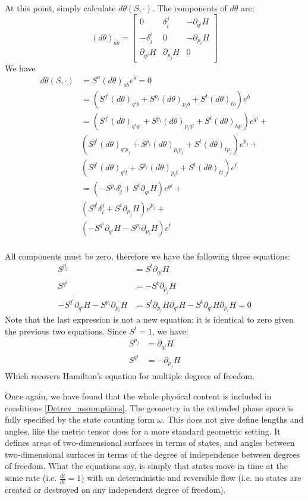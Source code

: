 \documentclass[10pt,twocolumn, nofootinbib]{revtex4-2}
\begin{document}
At this point, simply calculate $d\theta(S, \cdot ) $. The components of $d\theta$ are:
\begin{equation*}
	(d\theta)_{ab} = \begin{bmatrix}
		0 & \delta^j_i & - \partial_{q^i} H \\
		-\delta^i_j & 0 & - \partial_{p_i} H \\
		\partial_{q^j} H & \partial_{p_j} H & 0
	\end{bmatrix}
\end{equation*}
We have
\begin{align*}
	d\theta(S, \cdot )  &= S^a (d\theta)_{ab} e^b = 0 \\
	&= (S^{q^i}(d\theta)_{q^ib} + S^{p_i}(d\theta)_{p_ib} + S^{t}(d\theta)_{tb}) e^b \\
	&= (S^{q^i}(d\theta)_{q^iq^j} + S^{p_i}(d\theta)_{p_iq^j} + S^{t}(d\theta)_{tq^j}) e^{q^j} + \\
	& (S^{q^i}(d\theta)_{q^ip_j} +  S^{p_i}(d\theta)_{p_ip_j} + S^{t}(d\theta)_{tp_j}) e^{p_j} + \\
	& (S^{q^i}(d\theta)_{q^it} + S^{p_i}(d\theta)_{p_it} + S^{t}(d\theta)_{tt}) e^t \\
	&= (-S^{p_i}\delta^i_j + S^{t}\partial_{q^j} H ) e^{q^j} + \\
	& (S^{q^i}\delta^j_i +  S^{t}\partial_{p_j} H) e^{p_j} + \\
	& (-S^{q^i} \partial_{q^i} H - S^{p_i} \partial_{p_i} H) e^t \\
\end{align*}

All components must be zero, therefore we have the following three equations:
\begin{align*}
	S^{p_j} &= S^{t} \partial_{q^j} H \\
	S^{q^j} &= - S^{t}\partial_{p_j} H \\
	-S^{q^i} \partial_{q^i} H - S^{p_i} \partial_{p_i} H &= S^{t}\partial_{p_i} H \partial_{q^i} H - S^{t} \partial_{q^i} H \partial_{p_i} H = 0
\end{align*}
Note that the last expression is not a new equation: it is identical to zero given the previous two equations. Since $S^t = 1$, we have:
\begin{align*}
	S^{p_j} &= \partial_{q^j} H \\
	S^{q^j} &= - \partial_{p_j} H
\end{align*}
Which recovers Hamilton's equation for multiple degrees of freedom.

Once again, we have found that the whole physical content is included in conditions \ref{Detrev_assumptions}. The geometry in the extended phase space is fully specified by the state counting form $\omega$. This does not give define lengths and angles, like the metric tensor does for a more standard geometric setting. It defines areas of two-dimensional surfaces in terms of states, and angles between two-dimensional surfaces in terms of the degree of independence between degrees of freedom. What the equations say, is simply that states move in time at the same rate (i.e. $\frac{dt}{dt} = 1$) with an deterministic and reversible flow (i.e. no states are created or destroyed on any independent degree of freedom).
\end{document}
